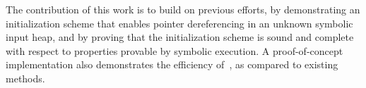 The contribution of this work is to build on previous efforts, by demonstrating an initialization scheme that enables pointer dereferencing in an unknown symbolic input heap, and by proving that the initialization scheme is sound and complete with respect to properties provable by symbolic execution. A proof-of-concept implementation also demonstrates the efficiency of~\symtxt{}, as compared to existing~\gsetxt{} methods.  

